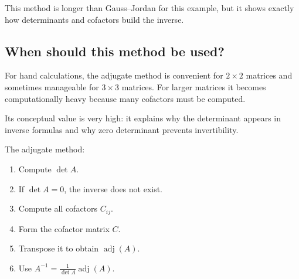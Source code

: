 This method is longer than Gauss--Jordan for this example, but it shows exactly how determinants and cofactors build the inverse.

\subsection{When should this method be used?}

For hand calculations, the adjugate method is convenient for \(2\times2\) matrices and sometimes manageable for \(3\times3\) matrices. For larger matrices it becomes computationally heavy because many cofactors must be computed.

Its conceptual value is very high: it explains why the determinant appears in inverse formulas and why zero determinant prevents invertibility.

\begin{summarybox}
The adjugate method:
\begin{enumerate}
\item Compute \(\det A\).
\item If \(\det A=0\), the inverse does not exist.
\item Compute all cofactors \(C_{ij}\).
\item Form the cofactor matrix \(C\).
\item Transpose it to obtain \(\operatorname{adj}(A)\).
\item Use \(A^{-1}=\frac{1}{\det A}\operatorname{adj}(A)\).
\end{enumerate}
\end{summarybox}
